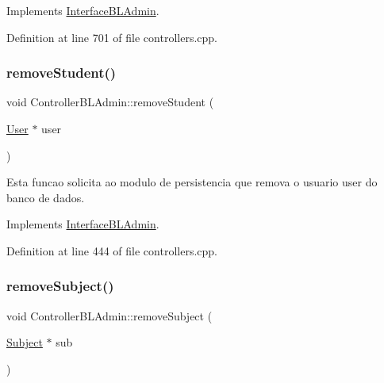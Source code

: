 Implements \hyperlink{class_interface_b_l_admin_a5e0da435e49e43b169b13725df5a354a}{Interface\+B\+L\+Admin}.



Definition at line 701 of file controllers.\+cpp.

\mbox{\label{class_controller_b_l_admin_ad504705ce46509672751a4adfe1fa773}} 
\subsubsection{\texorpdfstring{remove\+Student()}{removeStudent()}}
{\footnotesize\ttfamily void Controller\+B\+L\+Admin\+::remove\+Student (\begin{DoxyParamCaption}\item[{\hyperlink{class_user}{User} $\ast$}]{user }\end{DoxyParamCaption})\hspace{0.3cm}{\ttfamily [virtual]}}

Esta funcao solicita ao modulo de persistencia que remova o usuario user do banco de dados. 

Implements \hyperlink{class_interface_b_l_admin_ac1e32eeb8d7a76c933024fc639fff67f}{Interface\+B\+L\+Admin}.



Definition at line 444 of file controllers.\+cpp.

\mbox{\label{class_controller_b_l_admin_ab6be786a6347283943640ccba01ac2d1}} 
\subsubsection{\texorpdfstring{remove\+Subject()}{removeSubject()}}
{\footnotesize\ttfamily void Controller\+B\+L\+Admin\+::remove\+Subject (\begin{DoxyParamCaption}\item[{\hyperlink{class_subject}{Subject} $\ast$}]{sub }\end{DoxyParamCaption})\hspace{0.3cm}{\ttfamily [virtual]}}




